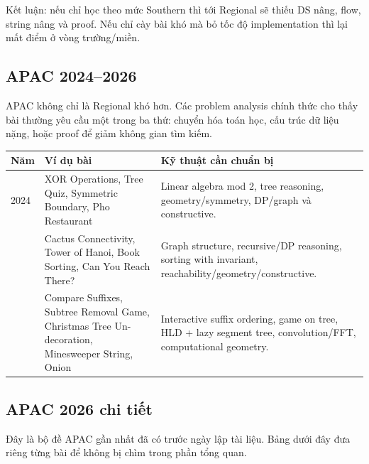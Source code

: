 \documentclass[11pt,a4paper]{article}
\begin{document}
Kết luận: nếu chỉ học theo mức Southern thì tới Regional sẽ thiếu DS nâng, flow, string nâng và proof. Nếu chỉ cày bài khó mà bỏ tốc độ implementation thì lại mất điểm ở vòng trường/miền.

\subsection{APAC 2024--2026}

APAC không chỉ là Regional khó hơn. Các problem analysis chính thức cho thấy bài thường yêu cầu một trong ba thứ: chuyển hóa toán học, cấu trúc dữ liệu nặng, hoặc proof để giảm không gian tìm kiếm.

\begin{longtable}{p{2.1cm}p{4.0cm}p{8.0cm}}
\toprule
\textbf{Năm} & \textbf{Ví dụ bài} & \textbf{Kỹ thuật cần chuẩn bị}\\
\midrule
2024 & XOR Operations, Tree Quiz, Symmetric Boundary, Pho Restaurant & Linear algebra mod 2, tree reasoning, geometry/symmetry, DP/graph và constructive.\\
\addlinespace
2025 & Cactus Connectivity, Tower of Hanoi, Book Sorting, Can You Reach There? & Graph structure, recursive/DP reasoning, sorting with invariant, reachability/geometry/constructive.\\
\addlinespace
2026 & Compare Suffixes, Subtree Removal Game, Christmas Tree Un-decoration, Minesweeper String, Onion & Interactive suffix ordering, game on tree, HLD + lazy segment tree, convolution/FFT, computational geometry.\\
\bottomrule
\end{longtable}

\subsection{APAC 2026 chi tiết}

Đây là bộ đề APAC gần nhất đã có trước ngày lập tài liệu. Bảng dưới đây đưa riêng từng bài để không bị chìm trong phần tổng quan.
\end{document}
